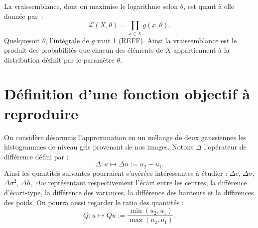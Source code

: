\documentclass[main.tex]{subfiles}
\begin{document}
La vraissemblance, dont on maximise le logarithme selon $\theta$, est quant à elle donnée par~:
\begin{equation}
\mathcal{L}(X,\theta) = \prod_{x \in X} g(x,\theta).
\end{equation}
Quelquesoit $\theta$, l'intégrale de $g$ vaut 1 (\cf REFF).
Ainsi la vraissemblance est le produit des probabilités que chacun des éléments de $X$ appartiennent à la distribution définit par le paramètre $\theta$.


\section{Définition d'une fonction objectif à reproduire}
On considère désormais l'approximation en un mélange de deux gaussiennes les histogrammes de niveau gris provenant de nos images. 
Notons $\Delta$ l'opérateur de différence défini par :
\begin{equation}
\label{eq:operateur_delta_gaussienne}
\Delta :  u \longmapsto \Delta u := u_2 - u_1.
\end{equation}
Ainsi les quantités suivantes pourraient s'avérées intéressantes à étudier : $\Delta c$, $\Delta \sigma$,  $\Delta \sigma^2$, $\Delta h$, $\Delta w$ représentant respectivement l'écart entre les centres, la différence d'écart-type, la différence des variances, la différence des hauteurs et la diffirences des poids. On pourra aussi regarder le ratio des quantités :
\begin{equation}
\label{eq:operateur_quotient_gaussienne}
Q :  u \longmapsto Qu := \dfrac{ \min( u_2 , u_1) }{ \max( u_2 , u_1)  }.
\end{equation}
\end{document}
